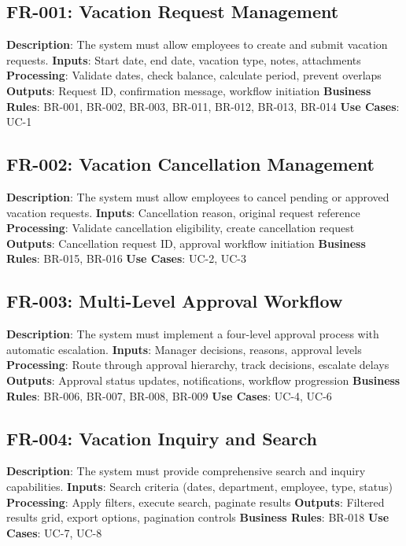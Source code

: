 \documentclass[12pt,a4paper]{article}
\begin{document}
\subsection{FR-001: Vacation Request Management}
\textbf{Description}: The system must allow employees to create and submit vacation requests.
\textbf{Inputs}: Start date, end date, vacation type, notes, attachments
\textbf{Processing}: Validate dates, check balance, calculate period, prevent overlaps
\textbf{Outputs}: Request ID, confirmation message, workflow initiation
\textbf{Business Rules}: BR-001, BR-002, BR-003, BR-011, BR-012, BR-013, BR-014
\textbf{Use Cases}: UC-1

\subsection{FR-002: Vacation Cancellation Management}
\textbf{Description}: The system must allow employees to cancel pending or approved vacation requests.
\textbf{Inputs}: Cancellation reason, original request reference
\textbf{Processing}: Validate cancellation eligibility, create cancellation request
\textbf{Outputs}: Cancellation request ID, approval workflow initiation
\textbf{Business Rules}: BR-015, BR-016
\textbf{Use Cases}: UC-2, UC-3

\subsection{FR-003: Multi-Level Approval Workflow}
\textbf{Description}: The system must implement a four-level approval process with automatic escalation.
\textbf{Inputs}: Manager decisions, reasons, approval levels
\textbf{Processing}: Route through approval hierarchy, track decisions, escalate delays
\textbf{Outputs}: Approval status updates, notifications, workflow progression
\textbf{Business Rules}: BR-006, BR-007, BR-008, BR-009
\textbf{Use Cases}: UC-4, UC-6

\subsection{FR-004: Vacation Inquiry and Search}
\textbf{Description}: The system must provide comprehensive search and inquiry capabilities.
\textbf{Inputs}: Search criteria (dates, department, employee, type, status)
\textbf{Processing}: Apply filters, execute search, paginate results
\textbf{Outputs}: Filtered results grid, export options, pagination controls
\textbf{Business Rules}: BR-018
\textbf{Use Cases}: UC-7, UC-8
\end{document}
